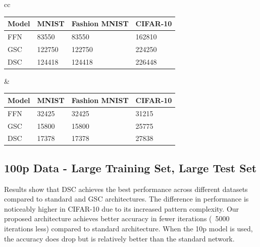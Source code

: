 \documentclass{article}
\begin{document}
\begin{tabular}{cc}
    \begin{minipage}{.5\linewidth}
\centering
\begin{tabular}{@{}llll@{}}
\toprule
\textbf{Model} & \textbf{MNIST} & \textbf{Fashion MNIST} & \textbf{CIFAR-10} \\ \midrule
FFN            & 83550          & 83550                  & 162810            \\
GSC            & 122750         & 122750                 & 224250            \\
DSC            & 124418         & 124418                 & 226448            \\ \bottomrule
\end{tabular}
\label{tab:100p_param_config}
    \end{minipage} &
    \begin{minipage}{.5\linewidth}
    \centering
    \begin{tabular}{@{}llll@{}}
\toprule
\textbf{Model} & \textbf{MNIST} & \textbf{Fashion MNIST} & \textbf{CIFAR-10} \\ \midrule
FFN            & 32425          & 32425                  & 31215             \\
GSC            & 15800          & 15800                  & 25775             \\
DSC            & 17378          & 17378                  & 27838             \\ \bottomrule
\end{tabular}
\label{tab:10p_param_config}
    \end{minipage} 
\end{tabular}


\subsection{100p Data - Large Training Set, Large Test Set}

Results show that DSC achieves the best performance across different datasets compared to standard and GSC architectures. The difference in performance is noticeably higher in CIFAR-10 due to its increased pattern complexity. Our proposed architecture achieves better accuracy in fewer iterations (~5000 iterations less) compared to standard architecture. When the 10p model is used, the accuracy does drop but is relatively better than the standard network.
\end{document}
